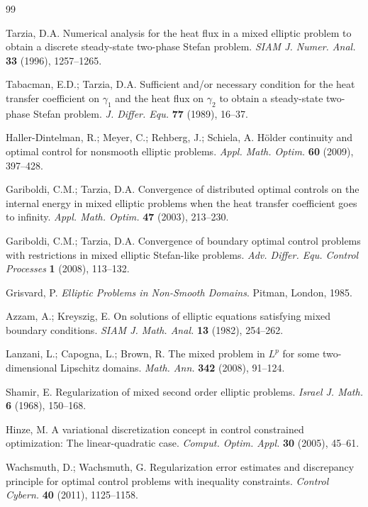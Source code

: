 \documentclass[11pt]{article}
\begin{document}
\begin{thebibliography}{99}

Tarzia, D.A.
Numerical analysis for the heat flux in a mixed elliptic problem to obtain a discrete steady-state two-phase Stefan problem.
{\em SIAM J. Numer. Anal.} {\bf 33} (1996), 1257--1265.

Tabacman, E.D.; Tarzia, D.A.
Sufficient and/or necessary condition for the heat transfer coefficient on $\gamma_1$ and the heat flux on $\gamma_2$ to obtain a steady-state two-phase Stefan problem.
{\em J. Differ. Equ.} {\bf 77} (1989), 16--37.

Haller-Dintelman, R.; Meyer, C.; Rehberg, J.; Schiela, A.
Hölder continuity and optimal control for nonsmooth elliptic problems.
{\em Appl. Math. Optim.} {\bf 60} (2009), 397--428.

Gariboldi, C.M.; Tarzia, D.A.
Convergence of distributed optimal controls on the internal energy in mixed elliptic problems when the heat transfer coefficient goes to infinity.
{\em Appl. Math. Optim.} {\bf 47} (2003), 213--230.

Gariboldi, C.M.; Tarzia, D.A.
Convergence of boundary optimal control problems with restrictions in mixed elliptic Stefan-like problems.
{\em Adv. Differ. Equ. Control Processes} {\bf 1} (2008), 113--132.

Grisvard, P.
{\em Elliptic Problems in Non-Smooth Domains}.
Pitman, London, 1985.

Azzam, A.; Kreyszig, E.
On solutions of elliptic equations satisfying mixed boundary conditions.
{\em SIAM J. Math. Anal.} {\bf 13} (1982), 254--262.

Lanzani, L.; Capogna, L.; Brown, R.
The mixed problem in $L^p$ for some two-dimensional Lipschitz domains.
{\em Math. Ann.} {\bf 342} (2008), 91--124.

Shamir, E.
Regularization of mixed second order elliptic problems.
{\em Israel J. Math.} {\bf 6} (1968), 150--168.

Hinze, M.
A variational discretization concept in control constrained optimization: The linear-quadratic case.
{\em Comput. Optim. Appl.} {\bf 30} (2005), 45--61.

Wachsmuth, D.; Wachsmuth, G.
Regularization error estimates and discrepancy principle for optimal control problems with inequality constraints.
{\em Control Cybern.} {\bf 40} (2011), 1125--1158.


\end{thebibliography}
\end{document}
